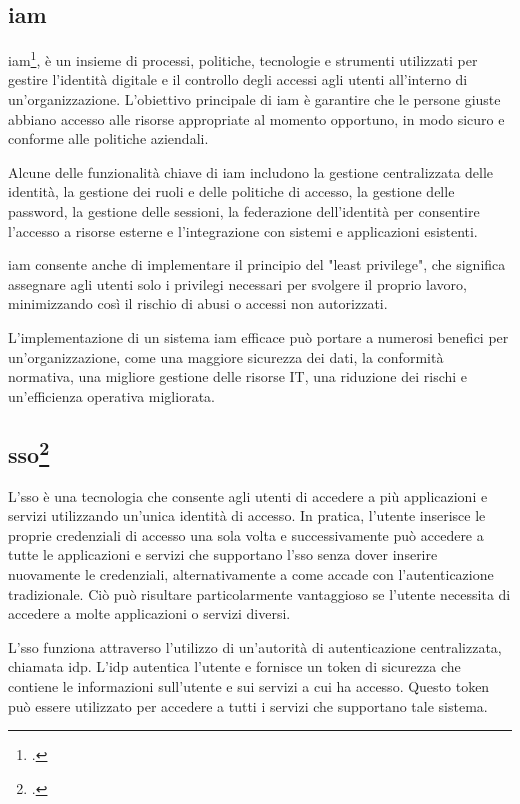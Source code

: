 \subsection{\acrlong{iam}}

\acrshort{iam}\footcite{site:iam}, è un insieme di processi, politiche, tecnologie e strumenti utilizzati per gestire l'identità digitale e il controllo degli accessi agli utenti all'interno di un'organizzazione. L'obiettivo principale di \acrshort{iam} è garantire che le persone giuste abbiano accesso alle risorse appropriate al momento opportuno, in modo sicuro e conforme alle politiche aziendali.

Alcune delle funzionalità chiave di \acrshort{iam} includono la gestione centralizzata delle identità, la gestione dei ruoli e delle politiche di accesso, la gestione delle password, la gestione delle sessioni, la federazione dell'identità per consentire l'accesso a risorse esterne e l'integrazione con sistemi e applicazioni esistenti.

\acrshort{iam} consente anche di implementare il principio del "least privilege", che significa assegnare agli utenti solo i privilegi necessari per svolgere il proprio lavoro, minimizzando così il rischio di abusi o accessi non autorizzati.

L'implementazione di un sistema \acrshort{iam} efficace può portare a numerosi benefici per un'organizzazione, come una maggiore sicurezza dei dati, la conformità normativa, una migliore gestione delle risorse IT, una riduzione dei rischi e un'efficienza operativa migliorata.


\subsection{\acrlong{sso}\footcite{site:sso}}

L'\acrshort{sso} è una tecnologia che consente agli utenti di accedere a più applicazioni e servizi utilizzando un'unica identità di accesso. In pratica, l'utente inserisce le proprie credenziali di accesso una sola volta e successivamente può accedere a tutte le applicazioni e servizi che supportano l'\acrshort{sso} senza dover inserire nuovamente le credenziali, alternativamente a come accade con l'autenticazione tradizionale. Ciò può risultare particolarmente vantaggioso se l'utente necessita di accedere a molte applicazioni o servizi diversi.

L'\acrshort{sso} funziona attraverso l'utilizzo di un'autorità di autenticazione centralizzata, chiamata \acrfull{idp}. L'\acrshort{idp} autentica l'utente e fornisce un token di sicurezza che contiene le informazioni sull'utente e sui servizi a cui ha accesso. Questo token può essere utilizzato per accedere a tutti i servizi che supportano tale sistema.

